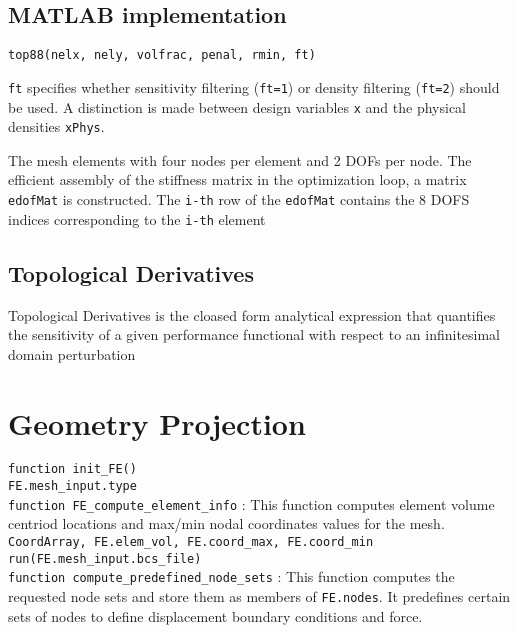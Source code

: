 \documentclass{article}
\newcommand{\code}[1]{\colorbox{light-gray}{\texttt{#1}}}
\begin{document}
\subsection*{MATLAB implementation}
\code{top88(nelx, nely, volfrac, penal, rmin, ft)}

\code{ft} specifies whether sensitivity filtering (\code{ft=1}) or density filtering (\code{ft=2}) should be used. A distinction is made between design variables \code {x} and the physical densities \code{xPhys}.

The mesh elements with four nodes per element and 2 DOFs per node. The efficient assembly of the stiffness matrix in the optimization loop, a matrix \code{edofMat} is constructed. The \code{i-th} row of the \code{edofMat} contains the 8 DOFS indices corresponding to the \code{i-th} element
\subsection*{Topological Derivatives}
Topological Derivatives is the cloased form analytical expression that quantifies the sensitivity of a given performance functional with respect to an infinitesimal domain perturbation

\section{Geometry Projection}
\code{function init\_FE()} \\
\indent\code{FE.mesh\_input.type} \\
\indent\code{function FE\_compute\_element\_info} :  This function computes element volume centriod locations and max/min nodal coordinates values for the mesh. \\
\indent\indent\code{CoordArray, FE.elem\_vol, FE.coord\_max, FE.coord\_min}\\
\indent\code{run(FE.mesh\_input.bcs\_file)}\\
\indent\indent\code{function compute\_predefined\_node\_sets} : This function computes the requested node sets and store them as members of \code{FE.nodes}. It predefines certain sets of nodes to define displacement boundary conditions and force.
\end{document}
